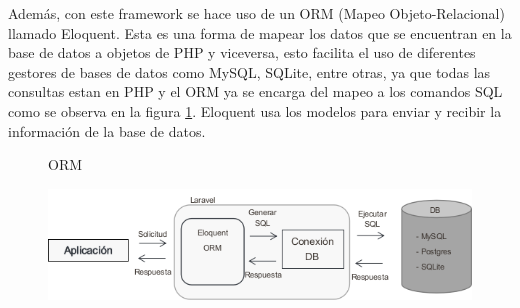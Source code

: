 Además, con este framework se hace uso de un ORM (Mapeo Objeto-Relacional) llamado Eloquent. Esta es una forma de mapear los datos que se encuentran en la base de datos a objetos de PHP y viceversa, esto facilita el uso de diferentes gestores de bases de datos como MySQL, SQLite, entre otras, ya que todas las consultas estan en PHP y el ORM ya se encarga del mapeo a los comandos SQL como se observa en la figura \ref{fig:orm}. Eloquent usa los modelos para enviar y recibir la información de la base de datos.

\begin{figure}[H]
	\centering
	\caption{ORM}
	\caption{}
	\label{fig:orm}
	\includegraphics[width=0.7\linewidth]{Imagenes/ORM}
\end{figure}


